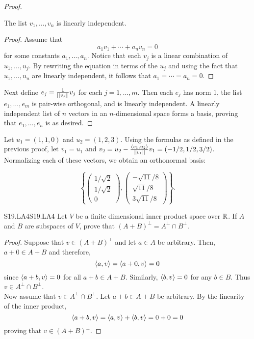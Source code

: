 \documentclass[../AlgebraQualSolutions.tex]{subfiles}
\begin{document}
\begin{proof}
        \begin{claim}
            The list $v_1, \ldots, v_n$ is linearly independent.

            \begin{proof}
                Assume that
                \[a_1v_1 + \cdots + a_nv_n = 0\]
                for some constants $a_1,\ldots, a_n$. Notice that each $v_j$ is a linear combination of $u_1,\ldots, u_j$. By rewriting the equation in terms of the $u_j$ and using the fact that $u_1,\ldots, u_n$ are linearly independent, it follows  that $a_1 = \cdots = a_n = 0$.
            \end{proof}
        \end{claim}

    Next define $e_j = \frac{1}{\norm[v_j]}v_j$ for each $j = 1,\ldots, m$. Then each $e_j$ has norm 1, the list $e_1,\ldots, e_m$ is pair-wise orthogonal, and is linearly independent. A linearly independent list of $n$ vectors in an $n$-dimensional space forms a basis, proving that $e_1,\ldots, e_n$ is as desired.
\end{proof}

\begin{solution}
    Let $u_1 = (1,1,0)$ and $u_2 = (1,2,3)$. Using the formulas as defined in the previous proof, let $v_1 = u_1$ and $v_2 = u_2 - \frac{\ip{v_1}{u_2}}{\norm[v_1]}v_1 = (-1/2,1/2,3/2)$. Normalizing each of these vectors, we obtain an orthonormal basis:

        \[\left\{ \begin{pmatrix} 1/\sqrt2\\ 1/\sqrt 2\\ 0 \end{pmatrix}, \begin{pmatrix}-\sqrt{11}/8 \\ \sqrt{11}/8\\ 3\sqrt{11}/8 \end{pmatrix} \right\}.\]
\end{solution}

\begin{prob}{S19.LA4}{S19.LA4}
    Let $V$ be a finite dimensional inner product space over $\R$. If $A$ and $B$ are subspaces of $V$, prove that $(A+B)^\perp = A^\perp \cap B^\perp$.
\end{prob}

\begin{proof}
    Suppose that $v \in (A+B)^\perp$ and let $a \in A$ be arbitrary. Then, $a + 0 \in A+B$ and therefore,
        \[\ip{a}{v} = \ip{a+0}{v} = 0\]
    since $\ip{a + b}{v} = 0$ for all $a + b \in A + B$. Similarly, $\ip{b}{v} = 0$ for any $b \in B$. Thus $v \in A^\perp \cap B^\perp$.\\

    Now assume that $v \in A^\perp \cap B^\perp$. Let $a + b \in A + B$ be arbitrary. By the linearity of the inner product,
        \[\ip{a + b}{v} = \ip{a}{v} + \ip{b}{v} = 0 + 0 = 0\]
    proving that $v \in (A+B)^\perp$.
\end{proof}
\end{document}
